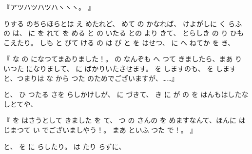 『アツハツハツハヽヽヽ。
』

りする
のちらほらとは
え
めたれど、
めて
の
かなれば、
けよがしに
く
らふ
の
は、
に
を
れて
を
める
と
の
いたる
との
より
きて、
とらしき
の
り
ひも
こえたり。
しも
と
びて
ける
の
は
び
と
を
はせつ、
に
へ
ねてか
を
き、

『
な
の
になつてまゐりました！。
の
なんぞも
へ
つて
きましたら、まあ
り
いつた
になりまして、
に
ばかりいたさせます。
を
しますのも、
を
しますと、つまりは
な
から
つた
のためでございますが、……』

と、
ひ
つたる
さを
らしかけしが、
に
づきて、
き
に
が
の
を
はんもはしたなしとてや、

『
を
はさうとして
きました
を
て、
つ
の
さんの
を
めますなんて、ほんに
はじまつて
い
でございましやう！。
まあ
といふ
つた
で！。
』

と、
を
に
らしたり。
は
たり
らずに、

